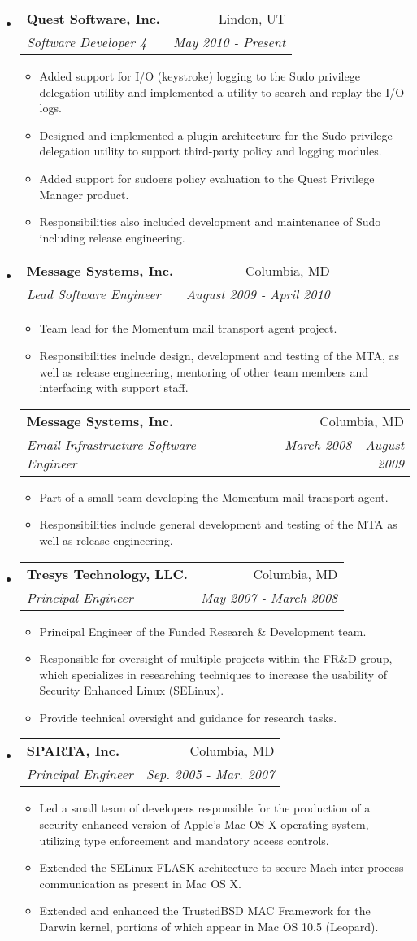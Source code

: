 \documentclass[letterpaper,11pt]{article}
\makeatletter
\newcommand{\resitem}[1]{\item #1 \vspace{-2pt}}
\newcommand{\resheading}[1]{{\large \fcolorbox{black}{mygrey}{\begin{minipage}{\textwidth}{\textbf{#1 \vphantom{p\^{E}}}}\end{minipage}}}}
\newcommand{\ressubheading}[4]{
\begin{tabular*}{7.0in}{l@{\extracolsep{\fill}}r}
		\textbf{#1} & #2 \\
		\textit{#3} & \textit{#4} \\
\end{tabular*}\vspace{-6pt}}
\makeatother
\begin{document}
\resheading{Work Experience}
\begin{itemize}
\item
	\ressubheading{Quest Software, Inc.}{Lindon, UT}{Software Developer 4}{May 2010 - Present}
	\begin{itemize}
		\resitem{Added support for I/O (keystroke) logging to the Sudo privilege delegation utility and implemented a utility to search and replay the I/O logs.}
		\resitem{Designed and implemented a plugin architecture for the Sudo privilege delegation utility to support third-party policy and logging modules.}
		\resitem{Added support for sudoers policy evaluation to the Quest Privilege Manager product.}
		\resitem{Responsibilities also included development and maintenance of Sudo including release engineering.}
	\end{itemize}
\item
	\ressubheading{Message Systems, Inc.}{Columbia, MD}{Lead Software Engineer}{August 2009 - April 2010}
	\begin{itemize}
		\resitem{Team lead for the Momentum mail transport agent project.}
		\resitem{Responsibilities include design, development and testing of the MTA, as well as release engineering, mentoring of other team members and interfacing with support staff.}
	\end{itemize}
	\ressubheading{Message Systems, Inc.}{Columbia, MD}{Email Infrastructure Software Engineer}{March 2008 - August 2009}
	\begin{itemize}
		\resitem{Part of a small team developing the Momentum mail transport agent.}
		\resitem{Responsibilities include general development and testing of the MTA as well as release engineering.}
	\end{itemize}

\item
	\ressubheading{Tresys Technology, LLC.}{Columbia, MD}{Principal Engineer}{May 2007 - March 2008}
	\begin{itemize}
		\resitem{Principal Engineer of the Funded Research \& Development team.}
		\resitem{Responsible for oversight of multiple projects within the FR\&D group, which specializes in researching techniques to increase the usability of Security Enhanced Linux (SELinux).}
		\resitem{Provide technical oversight and guidance for research tasks.}
	\end{itemize}

\item
	\ressubheading{SPARTA, Inc.}{Columbia, MD}{Principal Engineer}{Sep. 2005 - Mar. 2007}
	\begin{itemize}
		\resitem{Led a small team of developers responsible for the production of a security-enhanced version of Apple's Mac OS X operating system, utilizing type enforcement and mandatory access controls.}
		\resitem{Extended the SELinux FLASK architecture to secure Mach inter-process communication as present in Mac OS X.}
		\resitem{Extended and enhanced the TrustedBSD MAC Framework for the Darwin kernel, portions of which appear in Mac OS 10.5 (Leopard).}
	\end{itemize}


\end{itemize}
\end{document}
